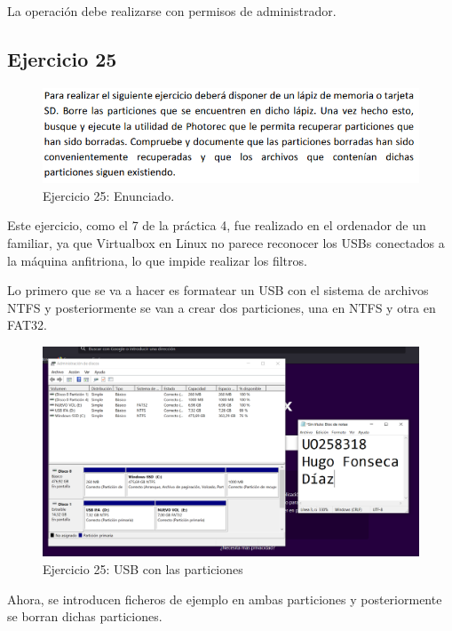 \documentclass[11pt]{article}
\begin{document}
La operación debe realizarse con permisos de administrador.

\subsection{Ejercicio 25}

\begin{figure}[H]
    \caption{Ejercicio 25: Enunciado.}
  \centering
  \includegraphics[scale=0.7]{other/enunciado_p05_e25.png}
\end{figure}

Este ejercicio, como el 7 de la práctica 4, fue realizado en el ordenador de un familiar, ya que Virtualbox en Linux no parece reconocer los USBs conectados a la máquina anfitriona, lo que impide realizar los filtros.

Lo primero que se va a hacer es formatear un USB con el sistema de archivos NTFS y posteriormente se van a crear dos particiones, una en NTFS y otra en FAT32.

\begin{figure}[H]
    \caption{Ejercicio 25: USB con las particiones}
  \centering
    \includegraphics[scale=0.4]{p05/e25-1.PNG}
\end{figure}

Ahora, se introducen ficheros de ejemplo en ambas particiones y posteriormente se borran dichas particiones.
\end{document}
